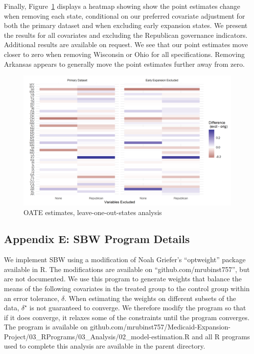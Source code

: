 \documentclass[12pt]{article}
\begin{document}
Finally, Figure~\ref{fig:oateheatmap} displays a heatmap showing show the point estimates change when removing each state, conditional on our preferred covariate adjustment for both the primary dataset and when excluding early expansion states. We present the results for all covariates and excluding the Republican governance indicators. Additional results are available on request.  We see that our point estimates move closer to zero when removing Wisconsin or Ohio for all specifications. Removing Arkansas appears to generally move the point estimates further away from zero.

\begin{figure}[]
\begin{center}
    \includegraphics[scale=0.6]{01_Plots/oate-loo-state-cov-group-heatmap-states.png}
    \caption{OATE estimates, leave-one-out-states analysis}
    \label{fig:oateheatmap}
\end{center}
\end{figure}

\subsection{Appendix E: SBW Program Details}

We implement SBW using a modification of Noah Griefer's ``optweight'' package available in R. The modifications are available on ``github.com/mrubinst757'', but are not documented. We use this program to generate weights that balance the means of the following covariates in the treated group to the control group within an error tolerance, $\delta$. When estimating the weights on different subsets of the data, $\delta^\star$ is not guaranteed to converge. We therefore modify the program so that if it does converge, it relaxes some of the constraints until the program converges. The program is available on github.com/mrubinst757/Medicaid-Expansion-Project/03\_RPrograms/03\_Analysis/02\_model-estimation.R and all R programs used to complete this analysis are available in the parent directory.
\end{document}
